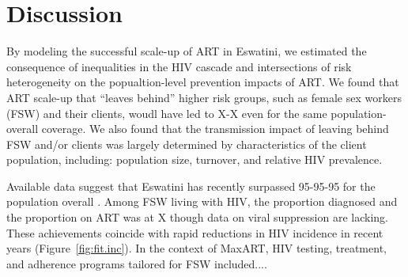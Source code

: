\section{Discussion}\label{art.disc} %
By modeling the successful scale-up of ART in Eswatini, we 
estimated the consequence of inequalities in the HIV cascade and intersections of risk heterogeneity on
the popualtion-level prevention impacts of ART.
We found that ART scale-up that ``leaves behind'' higher risk groups,
such as female sex workers (FSW) and their clients, woudl have led to  
X-X%
even for the same population-overall coverage.
We also found that the transmission impact of
leaving behind FSW and/or clients was largely determined by
characteristics of the client population, including:
population size, turnover, and relative HIV prevalence.
\par %
Available data suggest that
Eswatini has recently surpassed 95-95-95 for the population overall \cite{SHIMS3}.
Among FSW living with HIV, the proportion diagnosed and the proportion on ART was at X%
though data on viral suppression are lacking.
These achievements coincide with rapid reductions in HIV incidence in recent years
\cite{SHIMS1,SHIMS2,SHIMS3} (Figure~\ref{fig:fit.inc}).
In the context of MaxART, HIV testing, treatment, and adherence programs tailored for FSW included....

